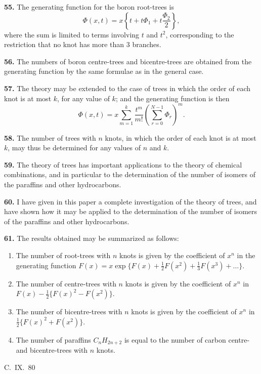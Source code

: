 \documentclass[11pt,a4paper]{book}
\begin{document}
{\medskip
\noindent\textbf{55.}
The generating function for the boron root-trees is
\[
\Phi(x,t) = x\left\{t + t\Phi_1 + t\frac{\Phi_2}{2}\right\},
\]
where the sum is limited to terms involving $t$ and $t^2$, corresponding to the restriction that no knot has more than 3 branches.

\medskip
\noindent\textbf{56.}
The numbers of boron centre-trees and bicentre-trees are obtained from the generating function by the same formulae as in the general case.

\medskip
\noindent\textbf{57.}
The theory may be extended to the case of trees in which the order of each knot is at most $k$, for any value of $k$; and the generating function is then
\[
\Phi(x,t) = x\sum_{m=1}^{k} \frac{t^m}{m!} \left(\sum_{r=0}^{N-1} \Phi_r\right)^m.
\]

\medskip
\noindent\textbf{58.}
The number of trees with $n$ knots, in which the order of each knot is at most $k$, may thus be determined for any values of $n$ and $k$.

\medskip
\noindent\textbf{59.}
The theory of trees has important applications to the theory of chemical combinations, and in particular to the determination of the number of isomers of the paraffins and other hydrocarbons.

\medskip
\noindent\textbf{60.}
I have given in this paper a complete investigation of the theory of trees, and have shown how it may be applied to the determination of the number of isomers of the paraffins and other hydrocarbons.

\medskip
\noindent\textbf{61.}
The results obtained may be summarized as follows:

\begin{enumerate}[label=\arabic*.]
\item The number of root-trees with $n$ knots is given by the coefficient of $x^n$ in the generating function $F(x) = x \exp\{F(x) + \frac{1}{2}F(x^2) + \frac{1}{3}F(x^3) + \ldots\}$.
\item The number of centre-trees with $n$ knots is given by the coefficient of $x^n$ in $F(x) - \frac{1}{2}\{F(x)^2 - F(x^2)\}$.
\item The number of bicentre-trees with $n$ knots is given by the coefficient of $x^n$ in $\frac{1}{2}\{F(x)^2 + F(x^2)\}$.
\item The number of paraffins $C_nH_{2n+2}$ is equal to the number of carbon centre- and bicentre-trees with $n$ knots.
\end{enumerate}
\hfill C.~IX.\ 80

}
\end{document}

